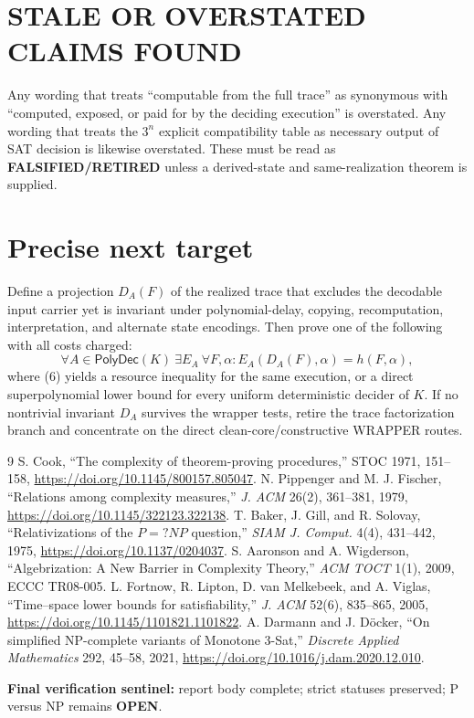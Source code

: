 \documentclass[11pt]{article}
\newcommand{\OPEN}{\textbf{OPEN}}
\newcommand{\RETIRED}{\textbf{FALSIFIED/RETIRED}}
\begin{document}
\section{STALE OR OVERSTATED CLAIMS FOUND}
Any wording that treats ``computable from the full trace'' as synonymous with
``computed, exposed, or paid for by the deciding execution'' is overstated.
Any wording that treats the $3^n$ explicit compatibility table as necessary
output of SAT decision is likewise overstated.  These must be read as
\RETIRED{} unless a derived-state and same-realization theorem is supplied.

\section{Precise next target}
Define a projection $D_A(F)$ of the realized trace that excludes the decodable
input carrier yet is invariant under polynomial-delay, copying,
recomputation, interpretation, and alternate state encodings.  Then prove one
of the following with all costs charged:
\[
 \forall A\in\mathsf{PolyDec}(K)\ \exists E_A\ \forall F,\alpha:
 E_A(D_A(F),\alpha)=h(F,\alpha),                          \tag{6}
\]
where (6) yields a resource inequality for the same execution, or a direct
superpolynomial lower bound for every uniform deterministic decider of $K$.
If no nontrivial invariant $D_A$ survives the wrapper tests, retire the trace
factorization branch and concentrate on the direct clean-core/constructive
WRAPPER routes.

\begin{thebibliography}{9}
 S. Cook, ``The complexity of theorem-proving procedures,''
STOC 1971, 151--158, \url{https://doi.org/10.1145/800157.805047}.
 N. Pippenger and M. J. Fischer, ``Relations among complexity
measures,'' \emph{J. ACM} 26(2), 361--381, 1979,
\url{https://doi.org/10.1145/322123.322138}.
 T. Baker, J. Gill, and R. Solovay, ``Relativizations of the
$P=?NP$ question,'' \emph{SIAM J. Comput.} 4(4), 431--442, 1975,
\url{https://doi.org/10.1137/0204037}.
 S. Aaronson and A. Wigderson, ``Algebrization: A New Barrier in
Complexity Theory,'' \emph{ACM TOCT} 1(1), 2009, ECCC TR08-005.
 L. Fortnow, R. Lipton, D. van Melkebeek, and A. Viglas,
``Time--space lower bounds for satisfiability,'' \emph{J. ACM} 52(6),
835--865, 2005, \url{https://doi.org/10.1145/1101821.1101822}.
 A. Darmann and J. D\"ocker, ``On simplified NP-complete
variants of Monotone 3-Sat,'' \emph{Discrete Applied Mathematics} 292,
45--58, 2021, \url{https://doi.org/10.1016/j.dam.2020.12.010}.
\end{thebibliography}

\noindent\textbf{Final verification sentinel:} report body complete; strict
statuses preserved; P versus NP remains \OPEN.
\end{document}
